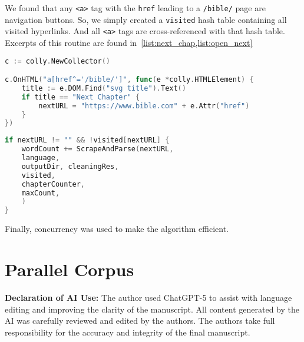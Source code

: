 \documentclass{article}
\begin{document}
We found that any \texttt{<a>} tag with the \texttt{href} leading to a \texttt{/bible/}
page are navigation buttons. So, we simply created a \texttt{visited} hash table 
containing all visited hyperlinks. And all \texttt{<a>} tags are cross-referenced with 
that hash table. Excerpts of this routine are found in~\cref{list:next_chap,list:open_next}

\begin{lstlisting}[language=Go, caption={Finding the next chapter using the HTML tags}, label={list:next_chap}]
c := colly.NewCollector()

c.OnHTML("a[href^='/bible/']", func(e *colly.HTMLElement) {
    title := e.DOM.Find("svg title").Text()
    if title == "Next Chapter" {
        nextURL = "https://www.bible.com" + e.Attr("href")
    }
})    
\end{lstlisting}

\begin{lstlisting}[language=Go, caption={Opening the next chapter}, label={list:open_next}]
if nextURL != "" && !visited[nextURL] {
    wordCount += ScrapeAndParse(nextURL,
    language,
    outputDir, cleaningRes,
    visited,
    chapterCounter,
    maxCount,
    )
}
\end{lstlisting}

Finally, concurrency was used to make the algorithm efficient.


\section{Parallel Corpus}




\vfill
{\footnotesize
\noindent\textbf{Declaration of AI Use:} The author used ChatGPT-5 to assist with language editing and improving the clarity of the manuscript. All content generated by the AI was carefully reviewed and edited by the authors. The authors take full responsibility for the accuracy and integrity of the final manuscript.
\par} 
\end{document}
